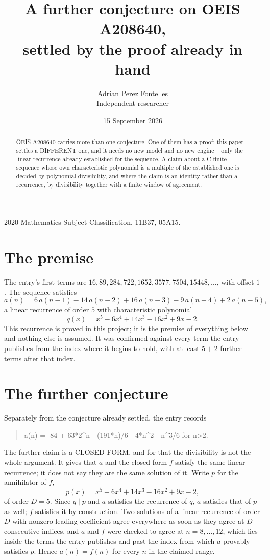 \documentclass[11pt,a4paper]{article}
\title{A further conjecture on OEIS A208640,\\ \large settled by the proof already in hand}
\author{Adrian Perez Fontelles\\ \small Independent researcher}
\date{15 September 2026}
\theoremstyle{plain}
\theoremstyle{definition}
\begin{document}
\maketitle

\begin{abstract}
OEIS A208640 carries more than one conjecture. One of them has a proof; this paper settles a
DIFFERENT one, and it needs no new model and no new engine -- only the linear recurrence already
established for the sequence. A claim about a C-finite sequence whose own characteristic
polynomial is a multiple of the established one is decided by polynomial divisibility, and where
the claim is an identity rather than a recurrence, by divisibility together with a finite window
of agreement.
\end{abstract}

\noindent\small 2020 Mathematics Subject Classification. 11B37, 05A15.\normalsize

\section{The premise}

The entry's first terms are $16, 89, 284, 722, 1652, 3577, 7504, 15448,\dots$, with offset $1$. The sequence satisfies
\[
  a(n)=6\,a(n-1) - 14\,a(n-2) + 16\,a(n-3) - 9\,a(n-4) + 2\,a(n-5) ,
\]
a linear recurrence of order $5$ with characteristic polynomial
\[
  q(x)=x^{5} - 6 x^{4} + 14 x^{3} - 16 x^{2} + 9 x - 2 .
\]
This recurrence is proved in this project; it is the premise of everything below and nothing else is assumed.
It was confirmed against every term the entry publishes from the index where it begins to hold,
with at least $5+2$ further terms after that index.

\section{The further conjecture}

Separately from the conjecture already settled, the entry records

\begin{quote}\raggedright a(n) = -84 + 63*2\^{}n - (191*n)/6 - 4*n\^{}2 - n\^{}3/6 for n>2.\end{quote}

The further claim is a CLOSED FORM, and for that the divisibility is not the whole argument. It
gives that $a$ and the closed form $f$ satisfy the same linear recurrence; it does not say they
are the same solution of it. Write $p$ for the annihilator of $f$,
\[
  p(x)=x^{5} - 6 x^{4} + 14 x^{3} - 16 x^{2} + 9 x - 2 ,
\]
of order $D=5$. Since $q\mid p$ and $a$ satisfies the recurrence of $q$, $a$ satisfies that of
$p$ as well; $f$ satisfies it by construction. Two solutions of a linear recurrence of order $D$
with nonzero leading coefficient agree everywhere as soon as they agree at $D$ consecutive
indices, and $a$ and $f$ were checked to agree at $n=8,\dots,12$,
which lies inside the terms the entry publishes and past the index from which $a$ provably
satisfies $p$. Hence $a(n)=f(n)$ for every $n$ in the claimed range.
\end{document}
